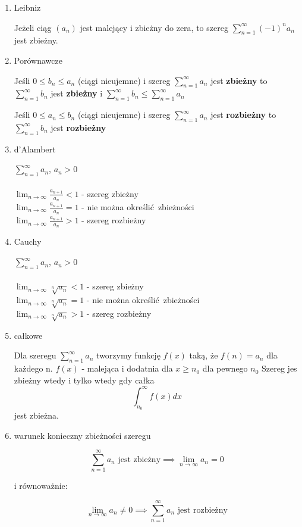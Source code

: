 \documentclass{article}
\theoremstyle{definition}
\theoremstyle{definition}
\theoremstyle{definition}
\begin{document}
\begin{enumerate}
\item Leibniz

     Jeżeli ciąg $(a_n)$ jest malejący i zbieżny
     do zera, to szereg $ \sum_{n=1}^{\infty} (-1)^n a_n $
     jest zbieżny.
\item Porównawcze

      Jeśli $ 0 \leq b_n \leq a_n $ (ciągi nieujemne) i szereg
      $ \sum_{n=1}^{\infty}a_n $ jest \textbf{zbieżny} to
      $ \sum_{n=1}^{\infty}b_n $ jest \textbf{zbieżny} i
      $ \sum_{n=1}^{\infty}b_n \leq \sum_{n=1}^{\infty}a_n $

      Jeśli $ 0 \leq a_n \leq b_n $ (ciągi nieujemne) i szereg
      $ \sum_{n=1}^{\infty}a_n $ jest \textbf{rozbieżny} to
      $ \sum_{n=1}^{\infty}b_n $ jest \textbf{rozbieżny}
\item d'Alambert

      $ \sum_{n=1}^{\infty}a_n $, $a_n >0$\\
      \\
      $ \lim_{n \to \infty} \frac{a_{n+1}}{a_n} < 1 $ - szereg zbieżny\\
      $ \lim_{n \to \infty} \frac{a_{n+1}}{a_n} = 1 $ - nie można określić zbieżności\\
      $ \lim_{n \to \infty} \frac{a_{n+1}}{a_n} > 1 $ - szereg rozbieżny
\item Cauchy

      $ \sum_{n=1}^{\infty}a_n $, $a_n >0$\\
      \\
      $ \lim_{n \to \infty} \sqrt[n]{a_n} < 1 $ - szereg zbieżny\\
      $ \lim_{n \to \infty} \sqrt[n]{a_n} = 1 $ - nie można określić zbieżności\\
      $ \lim_{n \to \infty} \sqrt[n]{a_n} > 1 $ - szereg rozbieżny
\item całkowe

      Dla szeregu $ \sum_{n=1}^{\infty}a_n $ tworzymy funkcję $f(x)$ taką,
      że $f(n) = a_n $ dla każdego n.
      $f(x)$ - malejąca i dodatnia dla $x \geq n_0 $ dla pewnego $n_0$
      Szereg jes zbieżny wtedy i tylko wtedy gdy całka
      $$
      \int_{n_0}^{\infty} f(x) dx
      $$
      jest zbieżna.
\item warunek konieczny zbieżności szeregu

      $$
      \sum_{n=1}^{\infty}a_n  \text{ jest zbieżny}
      \implies
      \lim_{n \to \infty} a_n =0
      $$

      i równoważnie:

      $$
      \lim_{n \to \infty} a_n \neq 0
      \implies
      \sum_{n=1}^{\infty}a_n  \text{ jest rozbieżny}
      $$
      
\end{enumerate}
\end{document}
